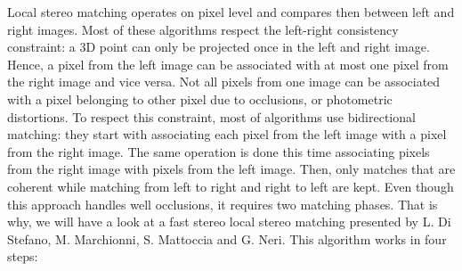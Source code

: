 \documentclass[12pt]{article}
\begin{document}
Local stereo matching operates on pixel level and compares then between left and right images. Most of these algorithms respect the left-right consistency constraint: a 3D point can only be projected once in the left and right image. Hence, a pixel from the left image can be associated with at most one pixel from the right image and vice versa. Not all pixels from one image can be associated with a pixel belonging to other pixel due to occlusions, or photometric distortions.
To respect this constraint, most of algorithms use bidirectional matching: they start with associating each pixel from the left image with a pixel from the right image. The same operation is done this time associating pixels from the right image with pixels from the left image. Then, only matches that are coherent while matching from left to right and right to left are kept. Even though this approach handles well occlusions, it requires two matching phases. That is why, we will have a look at a fast stereo local stereo matching presented by L. Di Stefano, M. Marchionni, S. Mattoccia and G. Neri\cite{Stefano02afast}.
This algorithm works in four steps:
\end{document}
